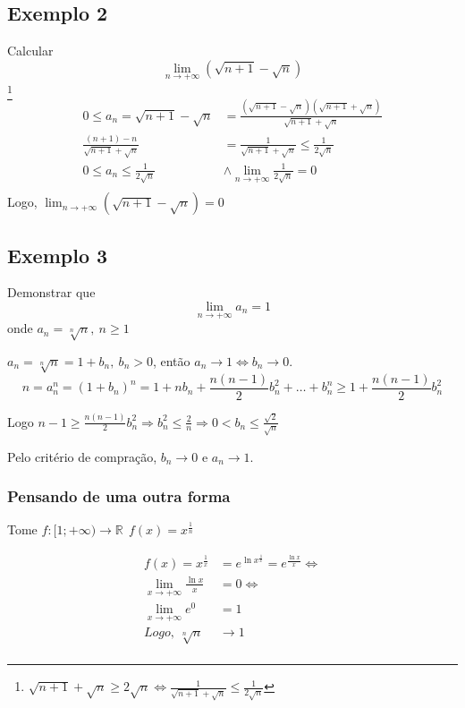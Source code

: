 \documentclass[12pt,openany, letterpaper]{book}
\begin{document}
\subsection*{Exemplo 2}
\label{subsec:ex222}
\hspace{5mm}Calcular $$\lim_{n \rightarrow +\infty} (\sqrt{n+1} - \sqrt{n})$$
\footnote{$\sqrt{n+1} + \sqrt{n} \geq 2\sqrt{n} \Longleftrightarrow \frac{1}{\sqrt{n+1} + \sqrt{n}} \leq \frac{1}{2\sqrt{n}} $}
\begin{align*}
0 \leq a_n = \sqrt{n+1} - \sqrt{n} &= \frac{(\sqrt{n+1} - \sqrt{n})(\sqrt{n+1} + \sqrt{n})}{\sqrt{n+1} + \sqrt{n}} \\
\frac{(n+1) - n}{\sqrt{n+1} + \sqrt{n}} &= \frac{1}{\sqrt{n+1} + \sqrt{n}} \leq \frac{1}{2\sqrt{n}}\\
0 \leq a_n \leq \frac{1}{2\sqrt{n}} & \land \lim_{n \rightarrow +\infty}\frac{1}{2\sqrt{n}} = 0  \\
\end{align*}
\hspace{5mm} Logo, $\displaystyle{\lim_{n \rightarrow +\infty} (\sqrt{n+1} - \sqrt{n}) = 0}$

\subsection*{Exemplo 3}
\label{subsec:ex223}
\hspace{5mm}Demonstrar que $$\lim_{n \rightarrow +\infty} a_n = 1$$ onde $a_n = \sqrt[n]{n},\ n \geq 1$

$a_n = \sqrt[n]{n} = 1 + b_n, \ b_n > 0$, então $a_n \rightarrow 1 \Longleftrightarrow b_n \rightarrow 0$.
$$n = a_n^n =(1+ b_n)^n = 1 + nb_n + \frac{n(n-1)}{2}b_n^2 + \hdots + b_n^n \geq 1 + \frac{n(n-1)}{2}b_n^2$$

Logo $\displaystyle{n-1 \geq \frac{n(n-1)}{2}b_n^2 \Rightarrow b_n^2 \leq \frac{2}{n} \Rightarrow 0 < b_n \leq \frac{\sqrt{2}}{\sqrt{n}}}$

Pelo critério de compração, $b_n \rightarrow 0$ e $a_n \rightarrow 1$.

\subsubsection{Pensando de uma outra forma} Tome $f: [1;+\infty) \rightarrow \mathds{R} \ \ f(x) = x^{\frac{1}{n}}$

\begin{align*}
f(x) = x^{\frac{1}{x}} &= e^{\ln x^{\frac{1}{x}}} =   e^{\frac{\ln x}{x}} \Longleftrightarrow \\
\lim_{x \rightarrow +\infty} \frac{\ln x}{x} &= 0 \Longleftrightarrow \\
\lim_{x \rightarrow +\infty} e^0 &= 1 \\
Logo, \ \sqrt[n]{n} & \rightarrow 1 \\
\end{align*}
\end{document}
